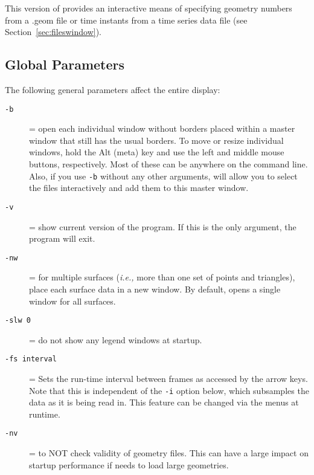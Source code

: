 This version of \map{} provides an interactive means of 
specifying geometry numbers from a .geom file or time instants from a 
time series data file (see Section~\ref{sec:fileswindow}).

\subsection{Global Parameters}
\label{sec:usage-global} 

\noindent
The following general parameters affect the entire display:
\begin{description}
    
  \item[{\tt -b }] = open each individual window without borders
    placed within a master window that still has the usual borders.  To
    move or resize individual windows, hold the Alt (meta) key and use the left
    and middle mouse buttons, respectively.  Most of these can be anywhere on
    the command line.  Also, if you use {\tt -b} without any other arguments,
    \map{} will allow you to select the files interactively and add them to
    this master window.
    
    
  \item [{\tt -v}] = show current version of the program.  If this is
    the only argument, the program will exit.
    
        
  \item[{\tt -nw}] = for multiple surfaces ({\em i.e.,} more than one
    set of points and triangles), place each surface data in a new
    window. By default, \map{} opens a single window for all
    surfaces.
    
  \item[{\tt -slw 0}] = do not show any legend windows at startup.

  \item[{\tt -fs interval}] = Sets the run-time interval between frames
    as accessed by the arrow keys.  Note that this is independent of the 
    {\tt -i} option below, which subsamples the data as it is being read in.
    This feature can be changed via the menus at runtime.
    
  \item[{\tt -nv}] = to NOT check validity of geometry files.  This can
    have a large impact on startup performance if \map{} needs to
    load large geometries.
    

\end{description}
